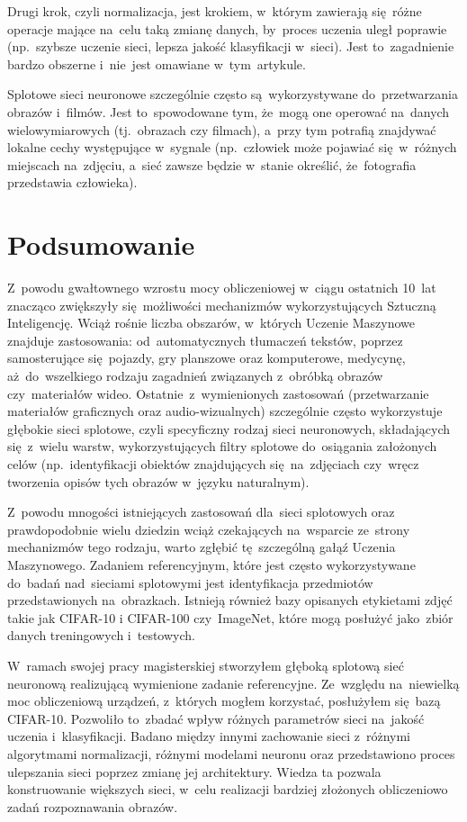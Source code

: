 \documentclass[oneside, 11pt, a4paper]{article}
\begin{document}
\begin{multicols}{2}
Drugi krok, czyli normalizacja, jest krokiem, w~którym zawierają się~różne operacje mające na~celu taką zmianę danych, by~proces uczenia uległ poprawie (np.~szybsze uczenie sieci, lepsza jakość klasyfikacji w~sieci). Jest to~zagadnienie bardzo obszerne i~nie~jest omawiane w~tym~artykule.

Splotowe sieci neuronowe szczególnie często są~wykorzystywane do~przetwarzania obrazów i~filmów.
Jest to~spowodowane tym, że~mogą one operować na~danych wielowymiarowych (tj.~obrazach czy filmach), a~przy tym potrafią znajdywać lokalne cechy występujące w~sygnale (np.~człowiek może pojawiać się~w~różnych miejscach na~zdjęciu, a~sieć zawsze będzie w~stanie określić, że~fotografia przedstawia człowieka).

\section{Podsumowanie}
Z~powodu gwałtownego wzrostu mocy obliczeniowej w~ciągu ostatnich 10~lat znacząco zwiększyły się~możliwości mechanizmów wykorzystujących Sztuczną Inteligencję. Wciąż rośnie liczba obszarów, w~których Uczenie Maszynowe znajduje zastosowania: od~automatycznych tłumaczeń tekstów, poprzez samosterujące się~pojazdy, gry planszowe oraz komputerowe, medycynę, aż~do~wszelkiego rodzaju zagadnień związanych z~obróbką obrazów czy~materiałów wideo. Ostatnie~z~wymienionych zastosowań (przetwarzanie materiałów graficznych oraz audio-wizualnych) szczególnie często wykorzystuje głębokie sieci splotowe, czyli specyficzny rodzaj sieci neuronowych, składających się~z~wielu warstw, wykorzystujących filtry splotowe do~osiągania założonych celów (np.~identyfikacji obiektów znajdujących się~na~zdjęciach czy~wręcz tworzenia opisów tych obrazów w~języku naturalnym).

Z~powodu mnogości istniejących zastosowań dla~sieci splotowych oraz prawdopodobnie wielu dziedzin wciąż czekających na~wsparcie ze~strony mechanizmów tego rodzaju, warto zgłębić tę~szczególną gałąź Uczenia Maszynowego. Zadaniem referencyjnym, które jest często wykorzystywane do~badań nad~sieciami splotowymi jest identyfikacja przedmiotów przedstawionych na~obrazkach. Istnieją również bazy opisanych etykietami zdjęć takie jak CIFAR-10 i CIFAR-100\cite{cifar10and100} czy~ImageNet\cite{imagenet}, które mogą posłużyć jako~zbiór danych treningowych i~testowych. 

W~ramach swojej pracy magisterskiej stworzyłem głęboką splotową sieć neuronową realizującą wymienione zadanie referencyjne. Ze~względu na~niewielką moc obliczeniową urządzeń, z~których mogłem korzystać, posłużyłem się~bazą CIFAR-10. Pozwoliło to~zbadać wpływ różnych parametrów sieci na~jakość uczenia i~klasyfikacji. Badano między innymi zachowanie sieci z~różnymi algorytmami normalizacji, różnymi modelami neuronu oraz przedstawiono proces ulepszania sieci poprzez zmianę jej architektury. Wiedza ta pozwala konstruowanie większych sieci, w~celu realizacji bardziej złożonych obliczeniowo zadań rozpoznawania obrazów.


\end{multicols}
\end{document}
